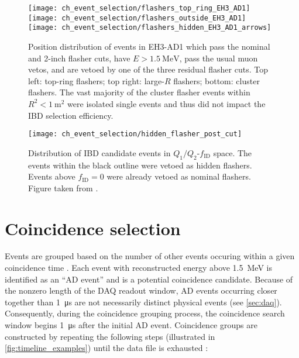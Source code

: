 \begin{figure}
    \centering
    \texttt{[image: ch\_event\_selection/flashers\_top\_ring\_EH3\_AD1]}
    \texttt{[image: ch\_event\_selection/flashers\_outside\_EH3\_AD1]}\\
    \texttt{[image: ch\_event\_selection/flashers\_hidden\_EH3\_AD1\_arrows]}
    \caption{
        Position distribution of events in EH3-AD1
        which pass the nominal and 2-inch flasher cuts,
        have $E > \SI{1.5}{\MeV}$, pass the usual muon vetos,
        and are vetoed by one of the three residual flasher cuts.
        Top left: top-ring flashers;
        top right: large-$R$ flashers;
        bottom: cluster flashers.
        The vast majority of the cluster flasher events
        within $R^2 < \SI{1}{\m\squared}$
        were isolated single events
        and thus did not impact the IBD selection efficiency.
    }
    \label{fig:flasher_resid_pos}
\end{figure}

\begin{figure}
    \centering
    \texttt{[image: ch\_event\_selection/hidden\_flasher\_post\_cut]}
    \caption{
        Distribution of IBD candidate events in $Q_1/Q_2$-$f_{\text{ID}}$ space.
        The events within the black outline were vetoed as
        hidden flashers.
        Events above $f_{\text{ID}}=0$ were already vetoed as nominal flashers.
        Figure taken from \cite{flasher_plots}.
    }
    \label{fig:hidden_flasher_cut}
\end{figure}


\section{Coincidence selection}
\label{sec:coincidence}

Events are grouped based on the number of other events
occuring within a given coincidence time \tc.
Each event with reconstructed energy above \SI{1.5}{\mega\electronvolt}
is identified as an ``AD event''
and is a potential coincidence candidate.
Because of the nonzero length of the DAQ readout window,
AD events occurring closer together than \SI{1}{\micro\second}
are not necessarily distinct physical events (see \cref{sec:daq}).
Consequently, during the coincidence grouping process,
the coincidence search window begins \SI{1}{\micro\second}
after the initial AD event.
Coincidence groups are constructed by repeating the following steps
(illustrated in \cref{fig:timeline_examples}) until the data file is exhausted \cite{thucoinc2015}:

